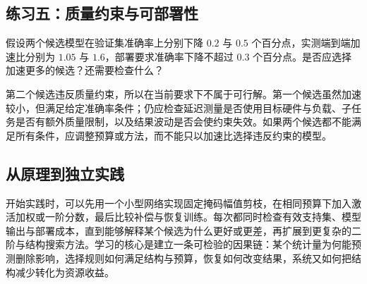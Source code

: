 \documentclass[UTF8,12pt,a4paper,fontset=fandol]{ctexart}
\begin{document}
\subsection{练习五：质量约束与可部署性}
假设两个候选模型在验证集准确率上分别下降 $0.2$ 与 $0.5$ 个百分点，实测端到端加速比分别为 $1.05$ 与 $1.6$，部署要求准确率下降不超过 $0.3$ 个百分点。是否应选择加速更多的候选？还需要检查什么？

\begin{solve}
第二个候选违反质量约束，所以在当前要求下不属于可行解。第一个候选虽然加速较小，但满足给定准确率条件；仍应检查延迟测量是否使用目标硬件与负载、子任务是否有额外质量限制，以及结果波动是否会使约束失效。如果两个候选都不能满足所有条件，应调整预算或方法，而不能只以加速比选择违反约束的模型。
\end{solve}

\subsection{从原理到独立实践}
开始实践时，可以先用一个小型网络实现固定掩码幅值剪枝，在相同预算下加入激活加权或一阶分数，最后比较补偿与恢复训练。每次都同时检查有效支持集、模型输出与部署成本，直到能够解释某个候选为什么更好或更差，再扩展到更复杂的二阶与结构搜索方法。学习的核心是建立一条可检验的因果链：某个统计量为何能预测删除影响，选择规则如何满足结构与预算，恢复如何改变结果，系统又如何把结构减少转化为资源收益。
\end{document}
